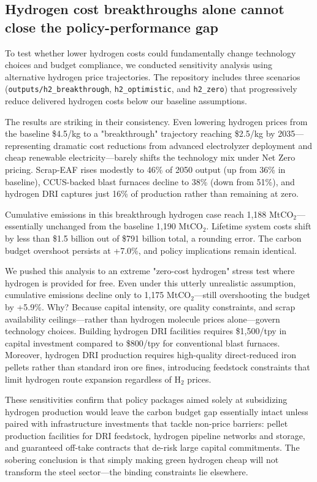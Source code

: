 \documentclass[preprint,1p,authoryear]{elsarticle}
\begin{document}
\subsection{Hydrogen cost breakthroughs alone cannot close the policy-performance gap}

To test whether lower hydrogen costs could fundamentally change technology choices and budget compliance, we conducted sensitivity analysis using alternative hydrogen price trajectories. The repository includes three scenarios (\texttt{outputs/h2\_breakthrough}, \texttt{h2\_optimistic}, and \texttt{h2\_zero}) that progressively reduce delivered hydrogen costs below our baseline assumptions.

The results are striking in their consistency. Even lowering hydrogen prices from the baseline \$4.5/kg to a "breakthrough" trajectory reaching \$2.5/kg by 2035—representing dramatic cost reductions from advanced electrolyzer deployment and cheap renewable electricity—barely shifts the technology mix under Net Zero pricing. Scrap-EAF rises modestly to 46\% of 2050 output (up from 36\% in baseline), CCUS-backed blast furnaces decline to 38\% (down from 51\%), and hydrogen DRI captures just 16\% of production rather than remaining at zero.

Cumulative emissions in this breakthrough hydrogen case reach 1,188 MtCO$_2$—essentially unchanged from the baseline 1,190 MtCO$_2$. Lifetime system costs shift by less than \$1.5 billion out of \$791 billion total, a rounding error. The carbon budget overshoot persists at +7.0\%, and policy implications remain identical.

We pushed this analysis to an extreme "zero-cost hydrogen" stress test where hydrogen is provided for free. Even under this utterly unrealistic assumption, cumulative emissions decline only to 1,175 MtCO$_2$—still overshooting the budget by +5.9\%. Why? Because capital intensity, ore quality constraints, and scrap availability ceilings—rather than hydrogen molecule prices alone—govern technology choices. Building hydrogen DRI facilities requires \$1,500/tpy in capital investment compared to \$800/tpy for conventional blast furnaces. Moreover, hydrogen DRI production requires high-quality direct-reduced iron pellets rather than standard iron ore fines, introducing feedstock constraints that limit hydrogen route expansion regardless of H$_2$ prices.

These sensitivities confirm that policy packages aimed solely at subsidizing hydrogen production would leave the carbon budget gap essentially intact unless paired with infrastructure investments that tackle non-price barriers: pellet production facilities for DRI feedstock, hydrogen pipeline networks and storage, and guaranteed off-take contracts that de-risk large capital commitments. The sobering conclusion is that simply making green hydrogen cheap will not transform the steel sector—the binding constraints lie elsewhere.
\end{document}
